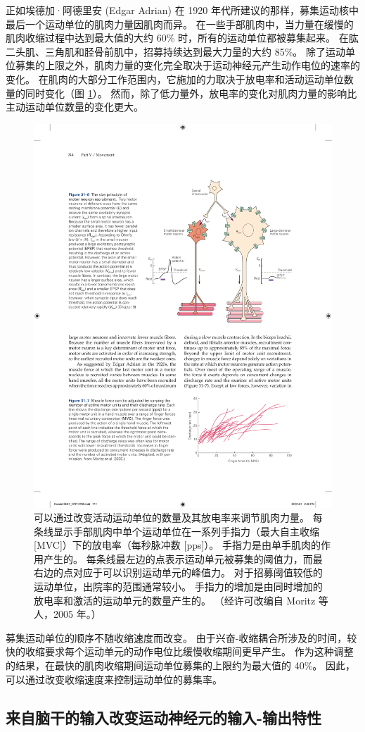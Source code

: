正如埃德加·阿德里安 (Edgar Adrian) 在 1920 年代所建议的那样，募集运动核中最后一个运动单位的肌肉力量因肌肉而异。
在一些手部肌肉中，当力量在缓慢的肌肉收缩过程中达到最大值的大约 60\% 时，所有的运动单位都被募集起来。
在肱二头肌、三角肌和胫骨前肌中，招募持续达到最大力量的大约 85\%。
除了运动单位募集的上限之外，肌肉力量的变化完全取决于运动神经元产生动作电位的速率的变化。
在肌肉的大部分工作范围内，它施加的力取决于放电率和活动运动单位数量的同时变化（图 \ref{fig:31_7}）。
然而，除了低力量外，放电率的变化对肌肉力量的影响比主动运动单位数量的变化更大。


\begin{figure}[htbp]
	\centering
	\includegraphics[width=0.5\linewidth]{chap31/fig_31_7}
	\caption{可以通过改变活动运动单位的数量及其放电率来调节肌肉力量。 每条线显示手部肌肉中单个运动单位在一系列手指力（最大自主收缩 [MVC]）下的放电率（每秒脉冲数 [pps]）。 手指力是由单手肌肉的作用产生的。 每条线最左边的点表示运动单元被募集的阈值力，而最右边的点对应于可以识别运动单元的峰值力。 对于招募阈值较低的运动单位，出院率的范围通常较小。 手指力的增加是由同时增加的放电率和激活的运动单元的数量产生的。 （经许可改编自 Moritz 等人，2005 年。）}
	\label{fig:31_7}
\end{figure}


募集运动单位的顺序不随收缩速度而改变。
由于兴奋-收缩耦合所涉及的时间，较快的收缩要求每个运动单元的动作电位比缓慢收缩期间更早产生。
作为这种调整的结果，在最快的肌肉收缩期间运动单位募集的上限约为最大值的 40\%。
因此，可以通过改变收缩速度来控制运动单位的募集率。


\subsection{来自脑干的输入改变运动神经元的输入-输出特性}

